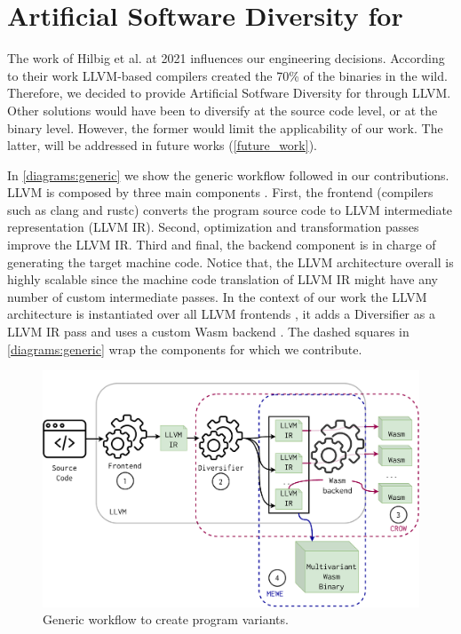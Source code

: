 \section{Artificial Software Diversity for \wasm}

The work of Hilbig et al. \cite{Hilbig2021AnES} at 2021 influences our engineering decisions. According to their work LLVM-based compilers created the 70\% of the \wasm binaries in the wild. Therefore, we decided to provide Artificial Sotfware Diversity for \wasm through LLVM. 
Other solutions would have been to diversify at the source code level, or at the \wasm binary level. However, the former would limit the applicability of our work. The latter, will be addressed in future works (\autoref{future_work}).

In \autoref{diagrams:generic} we show the generic workflow followed in our contributions. LLVM is composed by three main components \citationneeded. First, the frontend (compilers such as clang and rustc) converts the program source code to LLVM intermediate representation (LLVM IR). Second, optimization and transformation passes improve the LLVM IR. Third and final, the backend component is in charge of generating the target machine code. Notice that, the LLVM architecture overall is highly scalable since the machine code translation of LLVM IR might have any number of custom intermediate passes. 
In the context of our work the LLVM architecture is instantiated over all LLVM frontends , it adds a Diversifier as a LLVM IR pass  and uses a custom Wasm backend .
The dashed squares in \autoref{diagrams:generic} wrap the components for which we contribute.

\begin{figure}[h]
    \includegraphics[width=\linewidth]{diagrams/architecture.pdf}
    \caption{Generic workflow to create \wasm program variants.}
    \label{diagrams:generic}
\end{figure}


